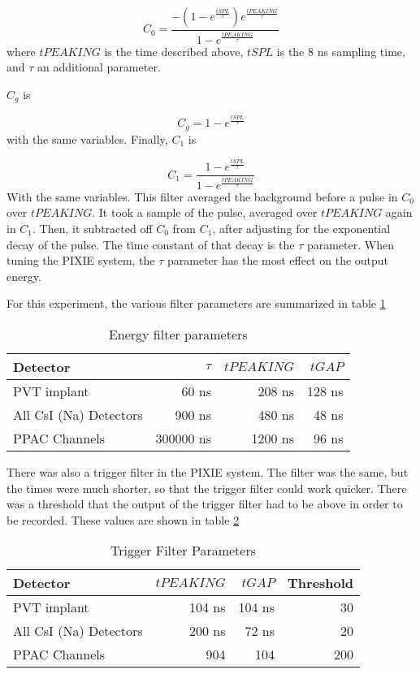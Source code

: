 \documentclass[main.tex]{subfiles}
\begin{document}
\begin{equation}
	C_{0} = \frac{-(1 - e^{\frac{tSPL}{\tau}})e^{\frac{tPEAKING}{\tau}}}{1 - e^{\frac{tPEAKING}{\tau}}}
	\label{eq:c0sum}
\end{equation}
%
where $tPEAKING$ is the time described above, $tSPL$ is the 8 ns sampling time, and $\tau$ an additional parameter.

$C_{g}$ is 

\begin{equation}
	C_{g} = 1 - e^{\frac{tSPL}{\tau}}
	\label{eq:cgsum}
\end{equation}
%
with the same variables.
Finally, $C_{1}$ is 

\begin{equation}
	C_{1} = \frac{1 - e^{\frac{tSPL}{\tau}}}{1 - e^{\frac{tPEAKING}{\tau}}}
	\label{eq:c1sum}
\end{equation}
%
With the same variables.
This filter averaged the background before a pulse in $C_{0}$ over $tPEAKING$.
It took a sample of the pulse, averaged over $tPEAKING$ again in $C_{1}$.
Then, it subtracted off $C_{0}$ from $C_{1}$, after adjusting for the exponential decay of the pulse.
The time constant of that decay is the $\tau$ parameter.
When tuning the PIXIE system, the $\tau$ parameter has the most effect on the output energy.

For this experiment, the various filter parameters are summarized in table \ref{tab:pixieparams}  
%
\begin{table}[!hbt]
	\centering
	\caption{Energy filter parameters}
			\begin{tabular}{lrrr}
			Detector & $\tau$ & $tPEAKING$ & $tGAP$ \\ \hline
			PVT implant & 60 ns & 208 ns & 128 ns \\
			All CsI (Na) Detectors & 900 ns & 480 ns & 48 ns \\
			PPAC Channels & 300000 ns & 1200 ns & 96 ns  
			\end{tabular}	
			\label{tab:pixieparams}
\end{table}
%

There was also a trigger filter in the PIXIE system.
The filter was the same, but the times were much shorter, so that the trigger filter could work quicker. 
There was a threshold that the output of the trigger filter had to be above in order to be recorded.
These values are shown in table \ref{tab:trigfilter}

%
\begin{table}[!hbt]
	\centering
	\caption{Trigger Filter Parameters}
		\begin{tabular}{lrrr}
		Detector & $tPEAKING$ & $tGAP$ & Threshold\\ \hline
		PVT implant & 104 ns & 104 ns & 30 \\ 
		All CsI (Na) Detectors & 200 ns & 72 ns & 20 \\
		PPAC Channels & 904 & 104 & 200 
		\end{tabular}	
		\label{tab:trigfilter}
\end{table}
%
\end{document}
